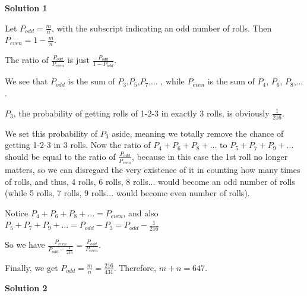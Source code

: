 \begin{enumerate}
\textbf{Solution 1}

Let $P_{odd}=\frac{m}{n}$, with the subscript indicating an odd number of rolls. Then $P_{even}=1-\frac{m}{n}$.

 The ratio of $\frac{P_{odd}}{P_{even}}$ is just $\frac{P_{odd}}{1-P_{odd}}$.

 We see that $P_{odd}$ is the sum of $P_3$,$P_5$,$P_7$,... , while $P_{even}$ is the sum of $P_4$, $P_6$, $P_8$,... .

 $P_3$, the probability of getting rolls of 1-2-3 in exactly 3 rolls, is obviously $\frac{1}{216}$.

 We set this probability of $P_3$ aside, meaning we totally remove the chance of getting 1-2-3 in 3 rolls. Now the ratio of $P_4+P_6+P_8+...$ to $P_5+P_7+P_9+...$ should be equal to the ratio of $\frac{P_{odd}}{P_{even}}$, because in this case the 1st roll no longer matters, so we can disregard the very existence of it in counting how many times of rolls, and thus, 4 rolls, 6 rolls, 8 rolls... would become an odd number of rolls (while 5 rolls, 7 rolls, 9 rolls... would become even number of rolls).

 Notice $P_4+P_6+P_8+...=P_{even}$, and also $P_5+P_7+P_9+...=P_{odd}-P_3=P_{odd}-\frac{1}{216}$

 So we have $\frac{P_{even}}{P_{odd}-\frac{1}{216}}=\frac{P_{odd}}{P_{even}}$.

 Finally, we get $P_{odd}=\frac{m}{n}=\frac{216}{431}$. Therefore, $m+n = \boxed{647}$.

 



\textbf{Solution 2}


\end{enumerate}
